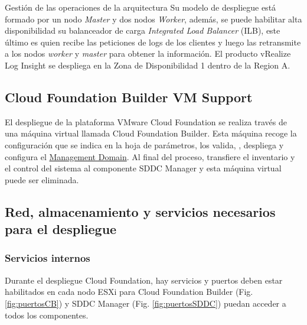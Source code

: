 \begin{subsection}{Gestión de las operaciones de la arquitectura}
Su modelo de despliegue está formado por un nodo \textit{Master} y dos nodos \textit{Worker}, además, se puede habilitar alta disponibilidad su balanceador de carga \textit{Integrated Load Balancer} (ILB), este último es quien recibe las peticiones de logs de los clientes y luego las retransmite a los nodos \textit{worker} y \textit{master} para obtener la información. El producto vRealize Log Insight se despliega en la Zona de Disponibilidad 1 dentro de la Region A.





\end{subsection}


\subsection{Cloud Foundation Builder VM Support}
\label{subsec:cloudBuilder}
El despliegue de la plataforma VMware Cloud Foundation se realiza través de una máquina virtual llamada Cloud Foundation Builder. Esta máquina recoge la configuración que se indica en la hoja de parámetros, los valida, , despliega y configura el \underline{Management Domain}. Al final del proceso, transfiere el inventario y el control del sistema al componente SDDC Manager y esta máquina virtual puede ser eliminada.\\

\subsection{Red, almacenamiento y servicios necesarios para el despliegue}

\subsubsection{Servicios internos}
\label{subsubsec:servInterno}
Durante el despliegue Cloud Foundation, hay servicios y puertos deben estar habilitados en cada nodo ESXi para Cloud Foundation Builder (Fig. \ref{fig:puertosCB}) y SDDC Manager (Fig. \ref{fig:puertosSDDC}) puedan acceder a todos los componentes.

